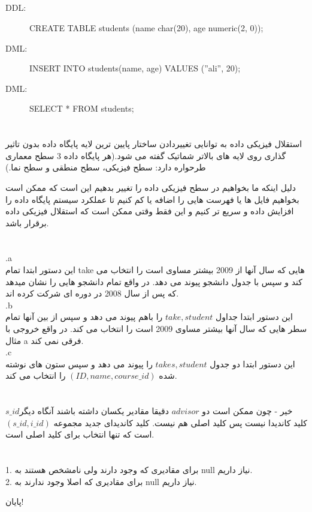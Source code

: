 \documentclass[a4paper]{article}
\newcommand{\goodbye}{\begin{center}{\huge
پایان!
}\end{center}}
\begin{document}
\subsection{}
	\begin{latin}
		\begin{description}
			\item[DDL:]
					CREATE TABLE students
					(name char(20),
					age numeric(2, 0));
			\item[DML:]
					INSERT INTO students(name, age) VALUES	(''ali'', 20);
			\item[DML:]
					SELECT * FROM students;
		\end{description}
	\end{latin}

\section{}
استقلال فیزیکی داده به توانایی تغییردادن ساختار پایین ترین لایه پایگاه داده بدون تاثیر گذاری روی لایه های بالاتر شماتیک گفته می شود.(هر پایگاه داده 3 سطح معماری طرحواره دارد: سطح فیزیکی، سطح منطقی و سطح نما.)

دلیل اینکه ما بخواهیم در سطح فیزیکی داده را تغییر بدهیم این است که ممکن است بخواهیم فایل ها یا فهرست هایی را اضافه یا کم کنیم تا عملکرد سیستم پایگاه داده را افزایش داده و سریع تر کنیم و این فقط وقتی ممکن است که استقلال فیزیکی داده برقرار باشد.

\section{}
.a\\
این دستور ابتدا تمام take هایی که سال آنها از 2009 بیشتر مساوی است را انتخاب می کند و سپس با جدول دانشجو پیوند می دهد. در واقع تمام دانشجو هایی را نشان میدهد که پس از سال 2008 در دوره ای شرکت کرده اند.
\\.b \\
این دستور ابتدا جداول $take, student$ را باهم پیوند می دهد و سپس از بین آنها تمام سطر هایی که سال آنها بیشتر مساوی 2009 است را انتخاب می کند. در واقع خروجی با مثال a فرقی نمی کند.
\\.c \\
این دستور ابتدا دو جدول $ takes, student $ را پیوند می دهد و سپس ستون های نوشته شده $(ID, name, course\_id)$ را انتخاب می کند.

\section{}
خیر - چون ممکن است دو $ advisor$ دقیقا مقادیر یکسان داشته باشند آنگاه دیگر$ s\_id$ کلید کاندیدا نیست پس کلید اصلی هم نیست. کلید کاندیدای جدید مجموعه $(s\_id, i\_id)$ است که تنها انتخاب برای کلید اصلی است.


\section{}
1. برای مقادیری که وجود دارند ولی نامشخص هستند به null نیاز داریم.
\\
2. برای مقادیری که اصلا وجود ندارند به null نیاز داریم.

\newpage
\goodbye
\end{document}
